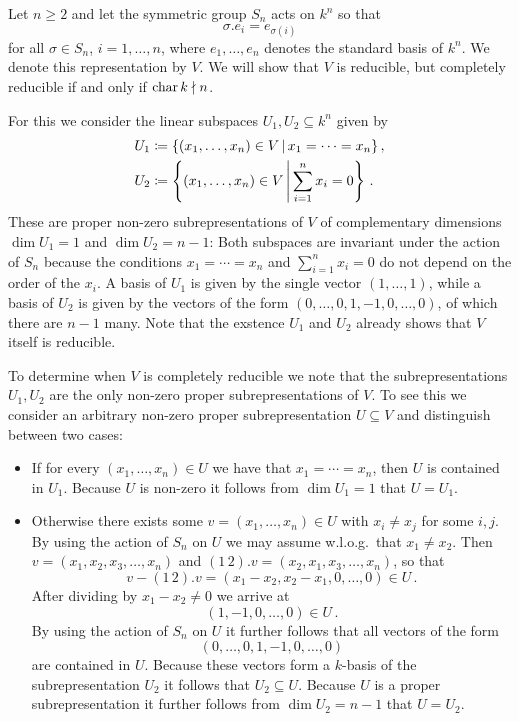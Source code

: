 \begin{example}
  \label{example: subrepresentations of natural action of Sn}
  Let $n \geq 2$ and let the symmetric group $S_n$ acts on $k^n$ so that
  \[
    \sigma.e_i = e_{\sigma(i)}
  \]
  for all $\sigma \in S_n$, $i = 1, \dotsc, n$, where $e_1, \dotsc, e_n$ denotes the standard basis of $k^n$.
  We denote this representation by $V$.
  We will show that $V$ is reducible, but completely reducible if and only if $\operatorname{char} k \nmid n$.

  For this we consider the linear subspaces $U_1, U_2 \subseteq k^n$ given by
  \begin{align*}
              U_1
    &\defined \{
                (x_1, \dotsc, x_n) \in V
              \suchthat
                x_1 = \dotsb = x_n
              \} \,,
    \\
              U_2
    &\defined \left\{
                (x_1, \dotsc, x_n) \in V
              \suchthat*
                \sum_{i=1}^n x_i = 0
              \right\} \,.
  \end{align*}
  These are proper non-zero subrepresentations of $V$ of complementary dimensions $\dim U_1 = 1$ and $\dim U_2 = n - 1$:
  Both subspaces are invariant under the action of $S_n$ because the conditions $x_1 = \dotsb = x_n$ and $\sum_{i=1}^n x_i = 0$ do not depend on the order of the $x_i$.
  A basis of $U_1$ is given by the single vector $(1, \dotsc, 1)$, while a basis of $U_2$ is given by the vectors of the form $(0, \dotsc, 0, 1, -1, 0, \dotsc, 0)$, of which there are $n-1$ many.
  Note that the exstence $U_1$ and $U_2$ already shows that $V$ itself is reducible.
  
  To determine when $V$ is completely reducible we note that the subrepresentations $U_1, U_2$ are the only non-zero proper subrepresentations of $V$.
  To see this we consider an arbitrary non-zero proper subrepresentation $U \subseteq V$ and distinguish between two cases:
  \begin{itemize}
    \item
      If for every $(x_1, \dotsc, x_n) \in U$ we have that $x_1 = \dotsb  = x_n$, then $U$ is contained in $U_1$.
      Because $U$ is non-zero it follows from $\dim U_1 = 1$ that $U = U_1$.
    \item
      Otherwise there exists some $v = (x_1, \dotsc, x_n) \in U$ with $x_i \neq x_j$ for some $i,j$.
      By using the action of $S_n$ on $U$ we may assume w.l.o.g.\ that $x_1 \neq x_2$.
      Then $v = (x_1, x_2, x_3, \dotsc, x_n)$ and $(1\,2).v = (x_2, x_1, x_3, \dotsc, x_n)$, so that
      \[
            v - (1\,2).v
        =   (x_1 - x_2, x_2 - x_1, 0, \dotsc, 0)
        \in U \,.
      \]
      After dividing by $x_1 - x_2 \neq 0$ we arrive at
      \[
            (1, -1, 0, \dotsc, 0)
        \in U \,.
      \]
      By using the action of $S_n$ on $U$ it further follows that all vectors of the form
      \[
        (0, \dotsc, 0, 1, -1, 0, \dotsc, 0)
      \]
      are contained in $U$.
      Because these vectors form a $k$-basis of the subrepresentation $U_2$ it follows that $U_2 \subseteq U$.
      Because $U$ is a proper subrepresentation it further follows from $\dim U_2 = n-1$ that $U = U_2$.
  \end{itemize}
  

\end{example}

